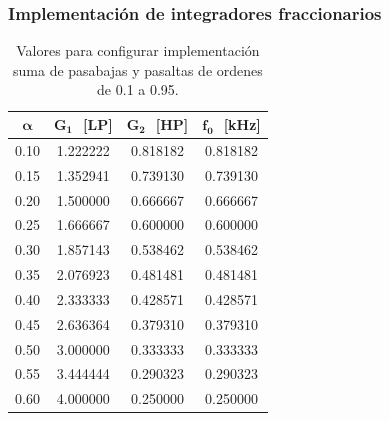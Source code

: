 \documentclass[10pt]{beamer}
\begin{document}
	\begin{frame}
		\frametitle{Implementación de integradores fraccionarios}
		\begin{minipage}[b]{0.45\textwidth}
			\begin{tiny}
			\begin{table}[!hbp]                                      
		\centering   
		\caption{Valores para configurar implementación suma de pasabajas y pasaltas de ordenes de 0.1 a 0.95.}                            
		\label{tab:calculos_bilineal_suma}                                        
			\begin{tabular}{cccc}                        
			\hline                                              
			$\bm{\alpha}$ & $\bm{G_{1}}\,\,$ [LP] & $\bm{G_{2}}\,\,$ [HP] & $\bm{f_{0}}\,\,$ [kHz]  \\            
			\hline                                              
			0.10 & 1.222222 & 0.818182 & 0.818182 \\ 
			                                 
			0.15 & 1.352941 & 0.739130 & 0.739130 \\ 
			                                 
			0.20 & 1.500000 & 0.666667 & 0.666667 \\ 
			                                
			0.25 & 1.666667 & 0.600000 & 0.600000 \\ 
			                                  
			0.30 & 1.857143 & 0.538462 & 0.538462 \\ 
			                                  
			0.35 & 2.076923 & 0.481481 & 0.481481 \\ 
			                                  
			0.40 & 2.333333 & 0.428571 & 0.428571 \\ 
			                               
			0.45 & 2.636364 & 0.379310 & 0.379310 \\ 
			                                 
			0.50 & 3.000000 & 0.333333 & 0.333333 \\ 
			                                   
			0.55 & 3.444444 & 0.290323 & 0.290323 \\ 
			                                  
			0.60 & 4.000000 & 0.250000 & 0.250000 \\ 
			                                 

\end{tabular}
\end{table}
\end{tiny}
\end{minipage}
\end{frame}
\end{document}
